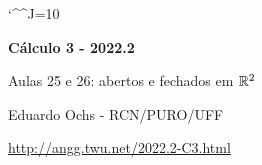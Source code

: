 \documentclass[oneside,12pt]{article}
\begin{document}
\catcode`\^^J=10
\pu
\def\pictgridstyle{\color{GrayPale}\linethickness{0.3pt}}
\def\pictaxesstyle{\linethickness{0.5pt}}
\def\pictnaxesstyle{\color{GrayPale}\linethickness{0.5pt}}
\celllower=2.5pt


\def\u#1{\par{\footnotesize \url{#1}}}

\def\drafturl{http://angg.twu.net/LATEX/2022-2-C3.pdf}
\def\drafturl{http://angg.twu.net/2022.2-C3.html}
\def\draftfooter{\tiny \href{\drafturl}{\jobname{}} \ColorBrown{\shorttoday{} \hours}}

\def\BA{\mathsf{B}}
\def\BF{\overline{\mathsf{B}}}




%

\thispagestyle{empty}

\begin{center}

\vspace*{1.2cm}

{\bf \Large Cálculo 3 - 2022.2}

\bsk

Aulas 25 e 26: abertos e fechados em $\mathbb{R}^2$

\bsk

Eduardo Ochs - RCN/PURO/UFF

\url{http://angg.twu.net/2022.2-C3.html}

\end{center}

\newpage

\end{document}
